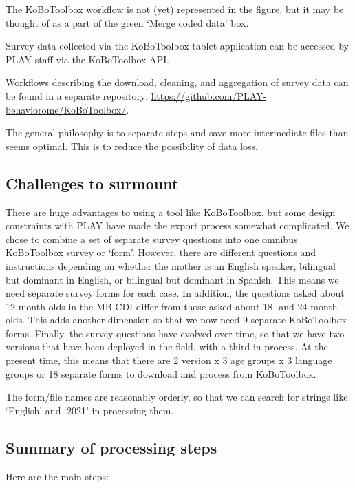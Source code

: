 \documentclass[
  12pt,
]{book}
\begin{document}
The KoBoToolbox workflow is not (yet) represented in the figure, but it may be thought of as a part of the green `Merge coded data' box.

Survey data collected via the KoBoToolbox tablet application can be accessed by PLAY staff via the KoBoToolbox API.

Workflows describing the download, cleaning, and aggregation of survey data can be found in a separate repository: \url{https://github.com/PLAY-behaviorome/KoBoToolbox/}.

The general philosophy is to separate steps and save more intermediate files than seems optimal. This is to reduce the possibility of data loss.

\hypertarget{challenges-to-surmount}{%
\subsection{Challenges to surmount}\label{challenges-to-surmount}}

There are huge advantages to using a tool like KoBoToolbox, but some design constraints with PLAY have made the export process somewhat complicated. We chose to combine a set of separate survey questions into one omnibus KoBoToolbox survey or `form'. However, there are different questions and instructions depending on whether the mother is an English speaker, bilingual but dominant in English, or bilingual but dominant in Spanish. This means we need separate survey forms for each case. In addition, the questions asked about 12-month-olds in the MB-CDI differ from those asked about 18- and 24-month-olds. This adds another dimension so that we now need 9 separate KoBoToolbox forms. Finally, the survey questions have evolved over time, so that we have two versions that have been deployed in the field, with a third in-process. At the present time, this means that there are 2 version x 3 age groups x 3 language groups or 18 separate forms to download and process from KoBoToolbox.

The form/file names are reasonably orderly, so that we can search for strings like `English' and `2021' in processing them.

\hypertarget{summary-of-processing-steps}{%
\subsection{Summary of processing steps}\label{summary-of-processing-steps}}

Here are the main steps:
\end{document}
